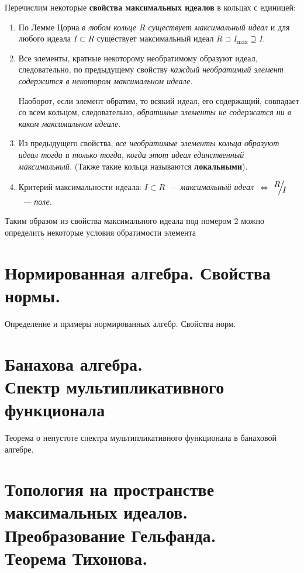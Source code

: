 \documentclass[12pt]{extarticle}
\theoremstyle{definition}
\newcommand{\factor}[2]{\raisebox{.35em}{$#1$}\kern-.27em\Big/\kern-.27em\raisebox{-.35em}{$#2$}}
\begin{document}
    Перечислим некоторые \textbf{свойства максимальных идеалов} в кольцах с единицей:
    \begin{enumerate}
        \item По Лемме Цорна \textit{в любом кольце $R$ существует максимальный идеал} и для любого идеала $I\subset R$ существует максимальный идеал $R\supset I_{\max}\supseteq I$.
        \item Все элементы, кратные некоторому необратимому образуют идеал, следовательно, по предыдущему свойству \textit{каждый необратимый элемент  содержится в некотором максимальном идеале}.

        Наоборот, если элемент обратим, то всякий идеал, его содержащий, совпадает со всем кольцом, следовательно, \textit{обратимые элементы не содержатся ни в каком максимальном идеале}.
        \item Из предыдущего свойства, \textit{все необратимые элементы кольца образуют идеал тогда и только тогда, когда этот идеал единственный максимальный.} (Также такие кольца называются \textbf{локальными}).
        \item Критерий максимальности идеала: \textit{$I\subset R$~--- максимальный идеал~$\iff$ $\factor{R}{I}$~--- поле.}
    \end{enumerate}

    Таким образом из свойства максимального идеала под номером 2 можно определить некоторые условия обратимости элемента

    \section[Нормы и нормированные алгебры]{Нормированная алгебра. Свойства нормы.}
        Определение и примеры нормированных алгебр. Свойства норм.

    \section[Банаховы алгебры. Спектр]{Банахова алгебра.\\Спектр мультипликативного функционала}
        Теорема о непустоте спектра мультипликативного функционала в банаховой алгебре.

    \section[Пространство максимальных идеалов]{Топология на пространстве максимальных идеалов. Преобразование Гельфанда.\\Теорема Тихонова.}
\end{document}
